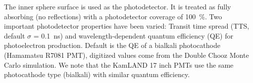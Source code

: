 \documentclass[aps,prc,twocolumn,groupedaddress,showpacs,amsmath,amssymb,floatfix,superscriptaddress]{revtex4}
\begin{document}
The inner sphere surface is used as the photodetector. It is treated as fully absorbing (no reflections) with a photodetector coverage of 100~\%. Two important photodetector properties have been varied: Transit time spread (TTS, default $\sigma$ = 0.1~ns) and wavelength-dependent quantum efficiency (QE) for photoelectron production. Default is the QE of a bialkali photocathode (Hamamatsu R7081 PMT), digitized values come from the Double Chooz \cite{dctwo} Monte Carlo simulation. We note that the KamLAND 17 inch PMTs use the same photocathode type (bialkali) with similar quantum efficiency.

\begin{figure}[tbh]
\begin{center}

\end{center}
\end{figure}
\end{document}

